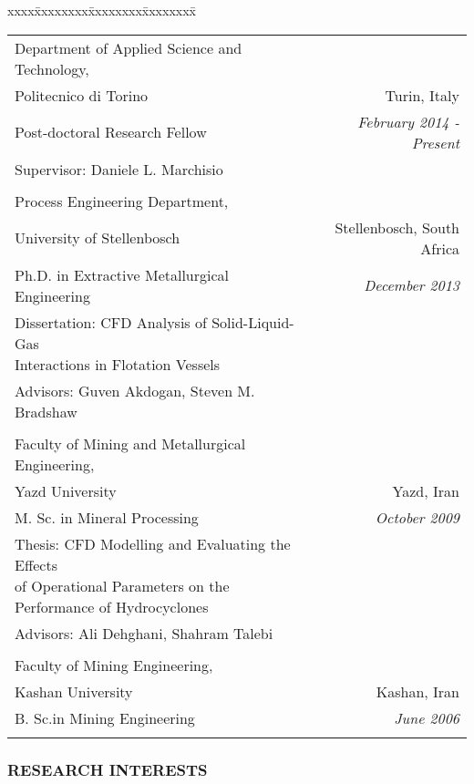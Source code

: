 \documentclass[10pt,a4]{article}
\newcommand{\quotes}[1]{``#1''}
\begin{document}
\begin{small}
\begin{tabbing}
xxxx\=xxxxxxxx\=xxxxxxxx\=xxxxxxxx\=\kill

\>\begin{tabular*}{0.97\linewidth}{l@{\extracolsep{\fill}}r}

Department of Applied Science and Technology, \\
Politecnico di Torino & Turin, Italy\\
Post-doctoral Research Fellow &
{\textit{February 2014 - Present}}\\
Supervisor: Daniele L. Marchisio \\ \\ 

Process Engineering Department, \\
University of Stellenbosch & Stellenbosch, South Africa\\
Ph.D. in  Extractive Metallurgical Engineering & 
{\it December 2013}\\
Dissertation: \quotes{CFD Analysis of Solid-Liquid-Gas \\Interactions in Flotation Vessels}\\
Advisors: Guven Akdogan, Steven M. Bradshaw \\
 & \\

Faculty of Mining and Metallurgical Engineering, \\
Yazd University & Yazd, Iran \\
M. Sc. in Mineral Processing &
{\it October 2009} \\
Thesis: \quotes{CFD Modelling and Evaluating the Effects \\of Operational Parameters
on the Performance of Hydrocyclones}\\
Advisors: Ali Dehghani, Shahram Talebi \\
 & \\

Faculty of Mining Engineering, \\
Kashan University & Kashan, Iran \\
B. Sc.in Mining Engineering &
{\it June 2006}\\
 & \\

\end{tabular*}
\end{tabbing}


\subsubsection*{RESEARCH INTERESTS}


\end{small}
\end{document}

